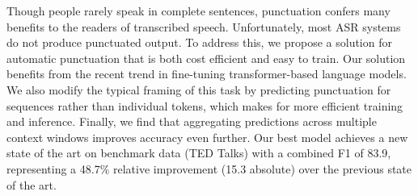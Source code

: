 Though people rarely speak in complete sentences, punctuation confers many benefits to the readers of transcribed speech. Unfortunately, most ASR systems do not produce punctuated output. To address this, we propose a solution for automatic punctuation that is both cost efficient and easy to train. Our solution benefits from the recent trend in fine-tuning transformer-based language models. We also modify the typical framing of this task by predicting punctuation for sequences rather than individual tokens, which makes for more efficient training and inference. Finally, we find that aggregating predictions across multiple context windows improves accuracy even further. Our best model achieves a new state of the art on benchmark data (TED Talks) with a combined F1 of 83.9, representing a 48.7\% relative improvement (15.3 absolute) over the previous state of the art.

